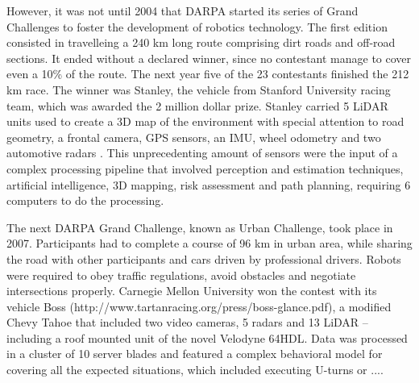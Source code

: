 However, it was not until 2004 that DARPA started its series of Grand Challenges
to foster the development of robotics technology. 
The first edition consisted in travelleing a 240 km long route comprising dirt 
roads and off-road sections. It ended without a declared winner, since no 
contestant manage to cover even a 10\% of the route.
The next year five of the 23 contestants finished the 212 km race. 
The winner was Stanley, the vehicle from Stanford University racing team, which 
was awarded the 2 million dollar prize.
Stanley carried 5 LiDAR units used to create a 3D map of the environment with 
special attention to road geometry, a frontal camera, GPS sensors, an IMU, 
wheel odometry and two automotive radars \cite{Thrun2006}. This unprecedenting
amount of sensors were the input of a complex processing pipeline that involved 
perception and estimation techniques, artificial intelligence, 3D mapping, risk 
assessment and path planning, requiring 6 computers to do the processing.

The next DARPA Grand Challenge, known as Urban Challenge, took place in 2007.
Participants had to complete a course of 96 km in urban area, while sharing the
road with other participants and cars driven by professional drivers. Robots
were required to obey traffic regulations, avoid obstacles and negotiate 
intersections properly. Carnegie Mellon University won the contest with 
its vehicle Boss (http://www.tartanracing.org/press/boss-glance.pdf), a 
modified Chevy Tahoe that included two video cameras, 
5 radars and 13 LiDAR --including a roof mounted unit of the novel Velodyne
64HDL. Data was processed in a cluster of 10 server blades and featured
a complex behavioral model \cite{Urmson2007} for covering all the expected
situations, which included executing U-turns or ....



